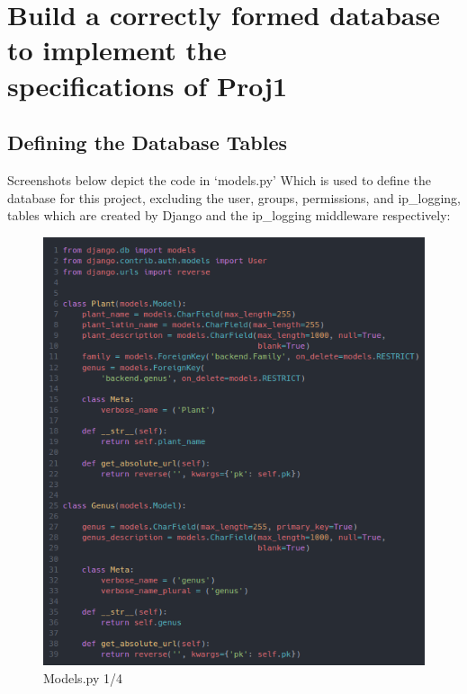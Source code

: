 \documentclass{article}
\begin{document}
    
	\section{Build a correctly formed database to implement the \\specifications of Proj1} 
    
    \subsection{Defining the Database Tables}
    
    Screenshots below depict the code in `models.py' Which is used to define the database for this project, excluding the user, groups, permissions, and ip\_logging, tables which are created by Django and the ip\_logging middleware respectively:
    
    \begin{figure}
        \centering
        \caption{Models.py 1/4}
        \includegraphics{models1}
    \end{figure}
\end{document}
